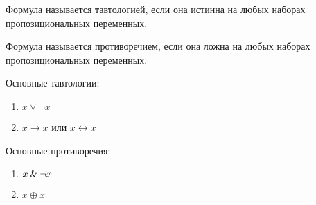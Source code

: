 \documentclass[main]{subfiles}
\begin{document}
\begin{definition}[Тавтология]
    Формула называется тавтологией, если она истинна на любых наборах пропозициональных переменных.
\end{definition}
\begin{definition}[Противоречие]
    Формула называется противоречием, если она ложна на любых наборах пропозициональных переменных.
\end{definition}
Основные тавтологии:
\begin{enumerate}
    \item $x \lor \lnot x$
    \item $x\to x$ или $x\leftrightarrow x$
\end{enumerate}
Основные противоречия:
\begin{enumerate}
    \item $x\mathbin{\&} \lnot x$
    \item $x\oplus x$
\end{enumerate}
\end{document}
